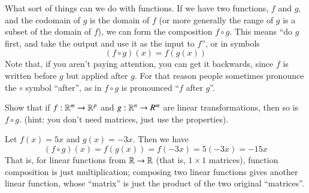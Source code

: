 What sort of things can we do with functions.
If we have two functions, $f$ and $g$, and the codomain of $g$ is the domain of $f$ (or more generally the range of $g$ is a subset of the domain of $f$), we can form the composition $f\circ g$.  
This means ``do $g$ first, and take the output and use it as the input to $f$'', or in symbols
\[(f\circ g)(x) = f(g(x))\]
Note that, if you aren't paying attention, you can get it backwards, since $f$ is written before $g$ but applied after $g$.
For that reason people sometimes pronounce the $\circ$ symbol ``after'', as in $f\circ g$ is pronounced ``$f$ after $g$''.  

\begin{Ex}
  Show that if $f:\mathbb{R}^m\to \mathbb{R}^p$ and $g:\mathbb{R}^n\to R^m$ are linear transformations, then so is $f\circ g$.  (hint: you don't need matrices, just use the properties).
\end{Ex}

Let $f(x) = 5x$ and $g(x)=-3x$.
Then we have
\[(f\circ g)(x) = f(g(x)) = f(-3x) = 5(-3x) = -15x\]
That is, for linear functions from $\mathbb{R}\to \mathbb{R}$ (that is, $1\times 1$ matrices), function composition is just multiplication; composing two linear functions gives another linear function, whose ``matrix'' is just the product of the two original ``matrices''.  

